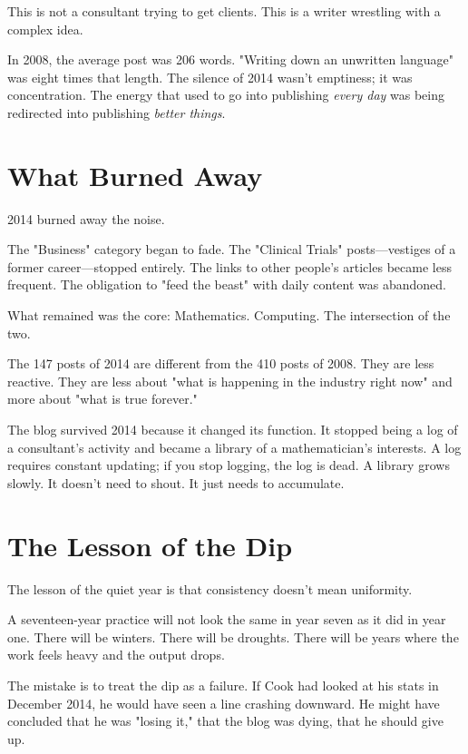 This is not a consultant trying to get clients. This is a writer wrestling with a complex idea.

In 2008, the average post was 206 words. "Writing down an unwritten language" was eight times that length. The silence of 2014 wasn't emptiness; it was concentration. The energy that used to go into publishing \textit{every day} was being redirected into publishing \textit{better things}.

\bigskip

\section*{What Burned Away}

2014 burned away the noise.

The "Business" category began to fade. The "Clinical Trials" posts---vestiges of a former career---stopped entirely. The links to other people's articles became less frequent. The obligation to "feed the beast" with daily content was abandoned.

What remained was the core: Mathematics. Computing. The intersection of the two.

The 147 posts of 2014 are different from the 410 posts of 2008. They are less reactive. They are less about "what is happening in the industry right now" and more about "what is true forever."

The blog survived 2014 because it changed its function. It stopped being a log of a consultant's activity and became a library of a mathematician's interests. A log requires constant updating; if you stop logging, the log is dead. A library grows slowly. It doesn't need to shout. It just needs to accumulate.

\bigskip

\section*{The Lesson of the Dip}

The lesson of the quiet year is that consistency doesn't mean uniformity.

A seventeen-year practice will not look the same in year seven as it did in year one. There will be winters. There will be droughts. There will be years where the work feels heavy and the output drops.

The mistake is to treat the dip as a failure. If Cook had looked at his stats in December 2014, he would have seen a line crashing downward. He might have concluded that he was "losing it," that the blog was dying, that he should give up.

